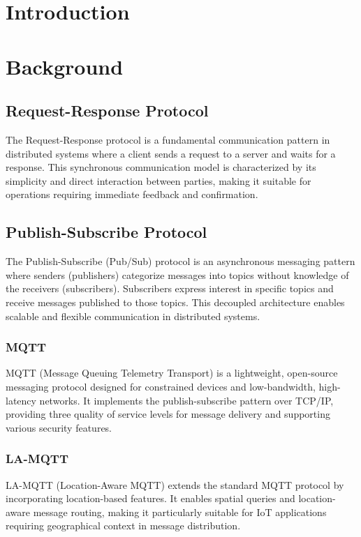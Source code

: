 \documentclass[12pt,a4paper,twoside]{book}
\begin{document}
\chapter{Introduction} \label{chap:intro}
\pagestyle{plain}
\setcounter{page}{1}




\chapter{Background}
\section{Request-Response Protocol}
The Request-Response protocol is a fundamental communication pattern in distributed systems where a client sends a request to a server and waits for a response. This synchronous communication model is characterized by its simplicity and direct interaction between parties, making it suitable for operations requiring immediate feedback and confirmation.

\section{Publish-Subscribe Protocol}
The Publish-Subscribe (Pub/Sub) protocol is an asynchronous messaging pattern where senders (publishers) categorize messages into topics without knowledge of the receivers (subscribers). Subscribers express interest in specific topics and receive messages published to those topics. This decoupled architecture enables scalable and flexible communication in distributed systems.

\subsection{MQTT}
MQTT (Message Queuing Telemetry Transport) is a lightweight, open-source messaging protocol designed for constrained devices and low-bandwidth, high-latency networks. It implements the publish-subscribe pattern over TCP/IP, providing three quality of service levels for message delivery and supporting various security features.

\subsection{LA-MQTT}
LA-MQTT (Location-Aware MQTT) extends the standard MQTT protocol by incorporating location-based features. It enables spatial queries and location-aware message routing, making it particularly suitable for IoT applications requiring geographical context in message distribution.
\end{document}
